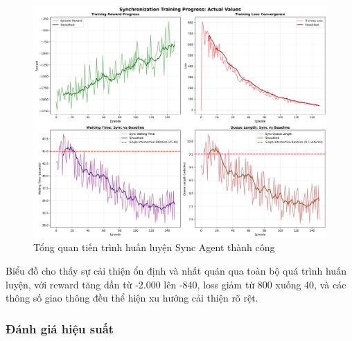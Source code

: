 \begin{figure}[!htp]
    \centering
    \includegraphics[width=\textwidth]{figures/training_overview.png}
    \caption{Tổng quan tiến trình huấn luyện Sync Agent thành công}
    \label{fig:sync_training_overview}
\end{figure}

Biểu đồ cho thấy sự cải thiện ổn định và nhất quán qua toàn bộ quá trình huấn luyện, với reward tăng dần từ -2.000 lên -840, loss giảm từ 800 xuống 40, và các thông số giao thông đều thể hiện xu hướng cải thiện rõ rệt.




\subsubsection{Đánh giá hiệu suất}

